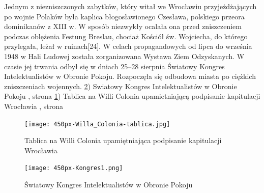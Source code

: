 \documentclass{article}
\begin{document}
\newline Jednym z niezniszczonych zabytków, który witał we Wrocławiu przyjeżdżających po wojnie Polaków była kaplica błogosławionego Czesława, polskiego przeora dominikanów z XIII w. W sposób niezwykły ocalała ona przed zniszczeniem podczas oblężenia Festung Breslau, chociaż Kościół św. Wojciecha, do którego przylegała, leżał w ruinach[24].
\vspace{3mm} %
\newline W celach propagandowych od lipca do września 1948 w Hali Ludowej została zorganizowana Wystawa Ziem Odzyskanych. W czasie jej trwania odbył się w dniach 25–28 sierpnia Światowy Kongres Intelektualistów w Obronie Pokoju. Rozpoczęła się odbudowa miasta po ciężkich zniszczeniach wojennych.
\newline\ref{fig:kongres}) Swiatowy Kongres Intelektualistów w Obronie Pokoju , strona \pageref{fig:kongres} 
\newline\ref{fig:tablica}) Tablica  na  Willi  Colonia  upamietniającą  podpisanie  kapitulacji Wrocławia
, strona \pageref{fig:tablica}
\begin{figure}[h!]
\centering
\texttt{[image: 450px-Willa\_Colonia-tablica.jpg]}
\caption{Tablica na Willi Colonia upamiętniająca podpisanie kapitulacji Wrocławia}
\label{fig:tablica}
\end{figure}

\begin{figure}[h!]
\centering
\texttt{[image: 450px-Kongres1.png]}
\caption{Światowy Kongres Intelektualistów w Obronie Pokoju}
\label{fig:kongres}
\end{figure}
\end{document}
